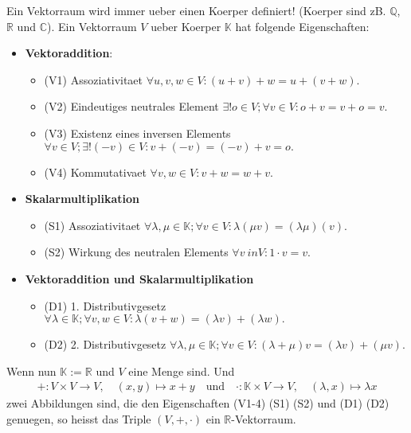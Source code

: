 \documentclass[12pt]{article}
\begin{document}
\begin{flushleft}
    Ein Vektorraum wird immer ueber einen Koerper definiert! (Koerper sind zB. $\mathbb{Q}$, $\mathbb{R}$ und $\mathbb{C}$).
    Ein Vektorraum $V$ ueber Koerper $\mathbb{K}$ hat folgende Eigenschaften:
    \begin{itemize}
        \item \textbf{Vektoraddition}:
        \begin{itemize}
            \item (V1) Assoziativitaet $\forall u,v,w \in V: (u + v) + w = u + (v + w).$
            \item (V2) Eindeutiges neutrales Element $\exists ! o \in V; \forall v \in V: o + v = v + o = v.$
            \item (V3) Existenz eines inversen Elements $\forall v \in V; \exists !(-v)\in V: v + (-v) = (-v) + v = o.$
            \item (V4) Kommutativaet $\forall v,w \in V: v + w = w + v.$
        \end{itemize}
        \item \textbf{Skalarmultiplikation}
        \begin{itemize}
            \item (S1) Assoziativitaet $\forall \lambda , \mu \in \mathbb{K}; \forall v \in V: \lambda(\mu v) = (\lambda \mu)(v).$
            \item (S2) Wirkung des neutralen Elements $\forall v \ in V: 1 \cdot v = v.$
        \end{itemize}
        \item \textbf{Vektoraddition und Skalarmultiplikation}
        \begin{itemize}
            \item (D1) 1. Distributivgesetz $\forall \lambda \in \mathbb{K}; \forall v,w \in V: \lambda(v + w) = (\lambda v) + (\lambda w).$
            \item (D2) 2. Distributivgesetz $\forall \lambda , \mu \in \mathbb{K}; \forall v \in V: (\lambda + \mu)v = (\lambda v) + (\mu v).$
        \end{itemize}
    \end{itemize}
    Wenn nun $\mathbb{K} := \mathbb{R}$ und $V$ eine Menge sind. Und \begin{align}
        +: V \times V \rightarrow V, \quad (x,y) \mapsto x + y \quad \text{und} \quad \cdot: \mathbb{K} \times V \to V, \quad (\lambda,x) \mapsto \lambda x
    \end{align}
    zwei Abbildungen sind, die den Eigenschaften (V1-4) (S1) (S2) und (D1) (D2) genuegen, so heisst das Triple $(V,+,\cdot)$ ein $\mathbb{R}$-Vektorraum.
\end{flushleft}
\end{document}
